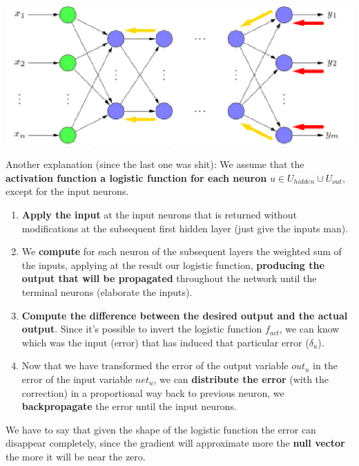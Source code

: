 \documentclass[11pt]{article}
\begin{document}
		\begin{center}
			\includegraphics[width=0.9\columnwidth]{img/NN/backprop1}
		\end{center}
		
		\newpage
		
		Another explanation (since the last one was shit): We assume that the \textbf{activation function a logistic function for each neuron} $u \in U_{hidden} \cup U_{out}$, except for the input neurons.
		\begin{enumerate}
			\item \textbf{Apply the input} at the input neurons that is returned without modifications at the subsequent first hidden layer (just give the inputs man). \\
			
			\item We \textbf{compute} for each neuron of the subsequent layers the weighted sum of the inputs, applying at the result our logistic function, \textbf{producing the output that will be propagated} throughout the network until the terminal neurons (elaborate the inputs).\\
			
			\item \textbf{Compute the difference between the desired output and the actual output}. Since it's possible to invert the logistic function $f_{act}$, we can know which was the input (error) that has induced that particular error ($\delta_u$).\\
			
			\item Now that we have transformed the error of the output variable $out_u$ in the error of the input variable $net_u$, we can \textbf{distribute the error} (with the correction) in a proportional way back to previous neuron, we \textbf{backpropagate} the error until the input neurons.\\
		\end{enumerate}
		
		We have to say that given the shape of the logistic function the error can disappear completely, since the gradient will approximate more the \textbf{null vector} the more it will be near the zero. \\
		
\end{document}
